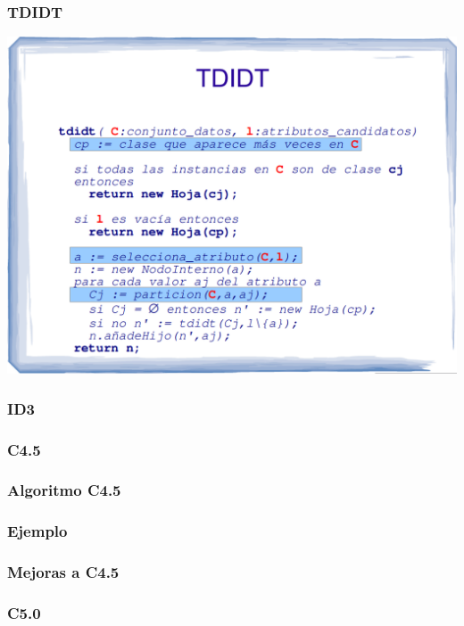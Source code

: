 \begin{frame}
  \frametitle{TDIDT}
\includegraphics[width=\textwidth]{./images/esquemaTDIDT.png}
\end{frame}

\begin{frame}
  \frametitle{ID3}
\end{frame}

\begin{frame}
  \frametitle{C4.5}
\end{frame}

\begin{frame}
  \frametitle{Algoritmo C4.5}
\end{frame}

\begin{frame}
  \frametitle{Ejemplo}
\end{frame}

\begin{frame}
  \frametitle{Mejoras a C4.5}
\end{frame}


\begin{frame}
  \frametitle{C5.0}
\end{frame}





